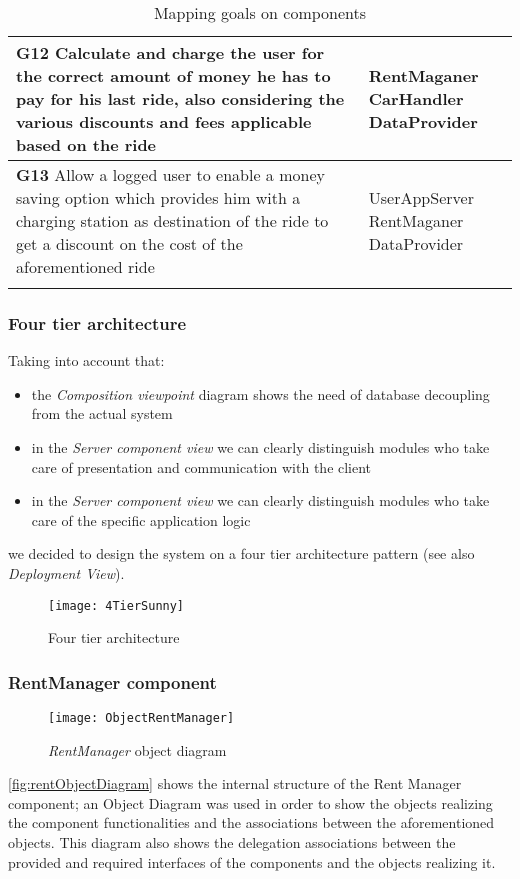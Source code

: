 \begin{longtable}{p{0.7\linewidth}p{0.3\linewidth}}
\midrule
\textbf{G12} Calculate and charge the user for the correct amount of money he has to pay for his last ride, also considering the various discounts and fees applicable based on the ride & \mbox{RentMaganer} \mbox{CarHandler} \mbox{DataProvider}\\
\midrule
\textbf{G13} Allow a logged user to enable a money saving option which provides him with a charging station as destination of the ride to get a discount on the cost of the aforementioned ride & \mbox{UserAppServer} \mbox{RentMaganer} \mbox{DataProvider}\\
\midrule
\bottomrule
\caption{Mapping goals on components}
\end{longtable}

\subsubsection{Four tier architecture}
Taking into account that:
\begin{itemize}
	\item the \emph{Composition viewpoint} diagram shows the need of database decoupling from the actual system
	\item in the \emph{Server component view} we can clearly distinguish modules who take care of presentation and communication with the client
	\item in the \emph{Server component view} we can clearly distinguish modules who take care of the specific application logic
\end{itemize}
we decided to design the system on a four tier architecture pattern (see also \emph{Deployment View}). 
	
\begin{figure}[h]
	\centering
	\texttt{[image: 4TierSunny]}
	\caption{
		\label{fig:fourTier} 
		Four tier architecture
	}
\end{figure}
		
\subsubsection{RentManager component}
\begin{figure}[h!]
	\centering
	\texttt{[image: ObjectRentManager]}
	\caption{
		\label{fig:rentObjectDiagram} 
		\emph{RentManager} object diagram
	}
\end{figure}
\autoref{fig:rentObjectDiagram} shows the internal structure of the Rent Manager component; an Object Diagram was used in order to show the objects realizing the component functionalities and the associations between the aforementioned objects. This diagram also shows the delegation associations between the provided and required interfaces of the components and the objects realizing it.

